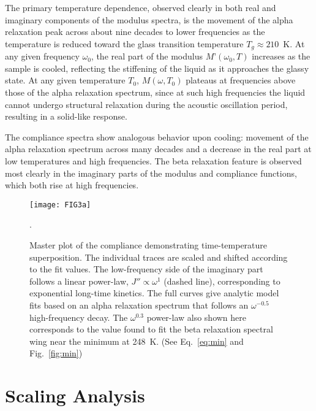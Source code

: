 \documentclass[reprint,showpacs,amsmath,amssymb,aip,jcp]{revtex4-1}
\begin{document}
The primary temperature dependence, observed clearly in both real and
imaginary components of the modulus spectra, is the movement of the
alpha relaxation peak across about nine decades to lower frequencies
as the temperature is reduced toward the glass transition temperature
$T_g\approx 210$~K. At any given frequency $\omega_0$, the real part
of the modulus $M’(\omega_0,T)$ increases as the sample is cooled,
reflecting the stiffening of the liquid as it approaches the glassy
state. At any given temperature $T_0$, $M(\omega, T_0)$ plateaus at
frequencies above those of the alpha relaxation spectrum, since at
such high frequencies the liquid cannot undergo structural relaxation
during the acoustic oscillation period, resulting in a solid-like
response.

The compliance spectra show analogous behavior upon cooling: movement
of the alpha relaxation spectrum across many decades and a decrease in
the real part at low temperatures and high frequencies. The beta
relaxation feature is observed most clearly in the imaginary parts of
the modulus and compliance functions, which both rise at high
frequencies.

\begin{figure}
  \begin{center}
    \texttt{[image: FIG3a]}
  \end{center}
  \caption{\label{fig:tts}Master plot of the compliance demonstrating
    time-temperature superposition. The individual traces are scaled
    and shifted according to the fit values. The low-frequency side of
    the imaginary part follows a linear power-law, $J'' \propto
    \omega^1$ (dashed line), corresponding to exponential long-time
    kinetics. The full curves give analytic model fits based on an
    alpha relaxation spectrum that follows an $\omega^{-0.5}$
    high-frequency decay. The $\omega^{0.3}$ power-law also shown here
    corresponds to the value found to fit the beta relaxation spectral
    wing near the minimum at 248~K. (See Eq.~\ref{eq:min} and
    Fig.~\ref{fig:min})}.
\end{figure}

\section{Scaling Analysis}
\end{document}

